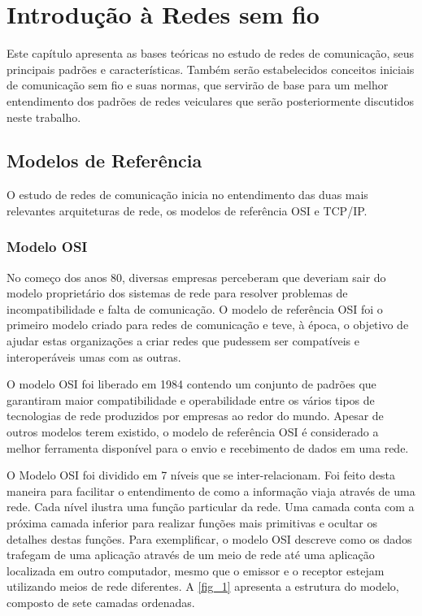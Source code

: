 \documentclass[
12pt,				%
openright,			%
oneside,			%
a4paper,			%
brazil,				%
]{abntex2}
\begin{document}
	\chapter{Introdução à Redes sem fio} %
	
	\par Este capítulo apresenta as bases teóricas no estudo de redes de comunicação, seus principais padrões e características. Também serão estabelecidos conceitos iniciais de comunicação sem fio e suas normas, que servirão de base para um melhor entendimento dos padrões de redes veiculares que serão posteriormente discutidos neste trabalho.
		
	\section{Modelos de Referência}
	
	\par O estudo de redes de comunicação inicia no entendimento das duas mais relevantes arquiteturas de rede, os modelos de referência OSI e TCP/IP. 

	\subsection{Modelo OSI}
	
	\par No começo dos anos 80, diversas empresas perceberam que deveriam sair do modelo proprietário dos sistemas de rede para resolver problemas de incompatibilidade e falta de comunicação. O modelo de referência OSI foi o primeiro modelo criado para redes de comunicação e teve, à época, o objetivo de ajudar estas organizações a criar redes que pudessem ser compatíveis e interoperáveis umas com as outras.
	
	\par O modelo OSI foi liberado em 1984 contendo um conjunto de padrões que garantiram maior compatibilidade e operabilidade entre os vários tipos de tecnologias de rede produzidos por empresas ao redor do mundo. Apesar de outros modelos terem existido, o modelo de referência OSI é considerado a melhor ferramenta disponível para o envio e recebimento de dados em uma rede.
	
	\par O Modelo OSI foi dividido em 7 níveis que se inter-relacionam. Foi feito desta maneira para facilitar o entendimento de como a informação viaja através de uma rede. Cada nível ilustra uma função particular da rede. Uma camada conta com a próxima camada inferior para realizar funções mais primitivas e ocultar os detalhes destas funções. Para exemplificar, o modelo OSI descreve como os dados trafegam de uma aplicação através de um meio de rede até uma aplicação localizada em outro computador, mesmo que o emissor e o receptor estejam utilizando meios de rede diferentes. A \autoref{fig_1} apresenta a estrutura do modelo, composto de sete camadas ordenadas.
	
\end{document}
